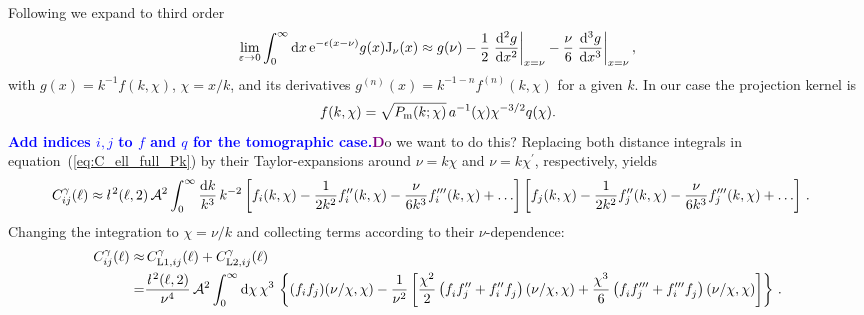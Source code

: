 \documentclass[fleqn,usenatbib]{mnras} %
\newcommand{\ellbar}{\hbox{\it \l}\,}
\newcommand{\pref}{{\cal A}}
\newcommand{\mk}[1]{{\bf\textcolor{blue}{#1}}}
\newcommand{\ch}[1]{\textcolor{purple}{\bf #1}}
\begin{document}
Following \cite{2008PhRvD..78l3506L} we expand to third order
%
\begin{equation}
  \lim_{\varepsilon \rightarrow 0} \int_0^\infty {\rm d} x \, {\rm e}^{-\epsilon (x - \nu)} g(x) {\rm J}_\nu(x)
  \approx g(\nu) - \frac 1 2 \left.\frac{{\rm d}^2 g}{{\rm d} x^2}\right|_{x=\nu}
                 - \frac \nu 6 \left.\frac{{\rm d}^3 g}{{\rm d} x^3}\right|_{x=\nu} ,
\end{equation}
%
with $g(x) = k^{-1} f(k, \chi)$, $\chi=x/k$, and its derivatives $g^{(n)}(x) =
k^{-1-n} f^{(n)}(k, \chi)$ for a given $k$. In our case the projection kernel is
%
\begin{equation}
  f(k, \chi) = \sqrt{P_{\rm m}(k; \chi)} \, a^{-1}(\chi) \chi^{-3/2} q(\chi).
  \label{eq:f_LA08}
\end{equation}
%
\mk{Add indices $i, j$ to $f$ and $q$ for the tomographic case.}{\ch Do we want to do this?}
%
Replacing both distance integrals in equation~(\ref{eq:C_ell_full_Pk}) by their Taylor-expansions around $\nu = k \chi$ and $\nu = k \chi^\prime$,
respectively, yields
%
\begin{align}
  C^\gamma_{ij}(\ell) \approx & \, \ellbar^2(\ell, 2) \, \pref^2
    \int_0^\infty \frac{{\rm d} k}{k^3} \, k^{-2}
    \left[ f_i(k, \chi) - \frac{1}{2 k^2} f_i^{\prime\prime}(k, \chi)
      - \frac{\nu}{6 k^3} f_i^{\prime\prime\prime}(k, \chi) + \ldots \right]
    \left[ f_j(k, \chi) - \frac{1}{2 k^2} f_j^{\prime\prime}(k, \chi)
    - \frac{\nu}{6 k^3} f_j^{\prime\prime\prime}(k, \chi) + \ldots \right] \, .
  \label{eq:C_ell_limber2_dk}
\end{align}
%
Changing the integration to $\chi = \nu/k$ and collecting terms according to their $\nu$-dependence:
%
\begin{align}
  C^\gamma_{ij}(\ell) \approx & \, C^\gamma_{{\rm L1}, ij}(\ell) + C^\gamma_{{\rm L2}, ij}(\ell)
      \nonumber \\
    = & \frac{\ellbar^2(\ell, 2)}{\nu^4} \, \pref^2
    \int_0^\infty {\rm d} \chi \, \chi^3 \, %
    \left\{
    (f_i f_j)(\nu/\chi, \chi)
     - \frac 1 {\nu^2} \left[ \frac{\chi^2}{2} \left( f^{}_i f^{\prime\prime}_j + f_i^{\prime\prime} f^{}_j \right)(\nu/\chi, \chi)
    + \frac{\chi^3}{6} \left( f^{}_i f^{\prime\prime\prime}_j + f^{\prime\prime\prime}_i f^{}_j \right)(\nu/\chi, \chi)
    \right]
    \right\} \, .
  \label{eq:C_ell_limber12_dr}
\end{align}
\end{document}
